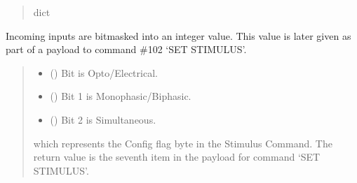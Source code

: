 \documentclass[letterpaper,10pt,english]{sphinxmanual}
\begin{document}
\begin{fulllineitems}
\begin{fulllineitems}
\begin{quote}
\begin{description}
\sphinxAtStartPar
dict

\end{description}\end{quote}

\end{fulllineitems}


\begin{fulllineitems}
\label{\detokenize{PodDevice_8480SC:PodDevice_8480SC.POD_8480SC.StimulusConfigBits}}
\pysigstartsignatures
{}
\pysigstopsignatures
\sphinxAtStartPar
Incoming inputs are bitmasked into an integer value. This value is later given as part of a payload         to command \#102 ‘SET STIMULUS’.
\begin{quote}\begin{description}
\begin{itemize}
\item {} 
\sphinxAtStartPar
{} () \textendash{} Bit  is Opto/Electrical.

\item {} 
\sphinxAtStartPar
{} () \textendash{} Bit 1 is Monophasic/Biphasic.

\item {} 
\sphinxAtStartPar
{} () \textendash{} Bit 2 is Simultaneous.

\end{itemize}

\sphinxAtStartPar
which represents the Config flag byte in the Stimulus Command.                 The return value is the seventh item in the payload for command ‘SET STIMULUS’.


\end{description}
\end{quote}
\end{fulllineitems}
\end{fulllineitems}
\end{document}
